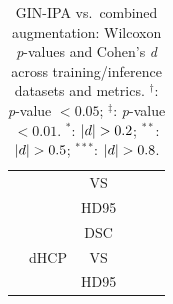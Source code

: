 \begin{table}[htbp]
\begin{tabular}{c|c|c|c|c|c}
      &                             & VS   &  &  &  \\
      &                             & HD95 &  &  &  \\
    \hhline{~-----}
      & \multirow{3}{*}{dHCP} & DSC  &  &  &  \\
      &                       & VS   &  &  &  \\
      &                       & HD95 &  &  &  \\
    \bottomrule
  \end{tabular}
  \caption{GIN-IPA vs.\ combined augmentation: Wilcoxon \textit{p}-values and Cohen's \textit{d} across training/inference datasets and metrics. ${ }^{\dagger}$: \textit{p}-value $< 0.05$; ${ }^{\ddagger}$: \textit{p}-value $<0.01$. ${ }^{*}$: $\lvert d\rvert>0.2$; ${ }^{**}$: $\lvert d\rvert>0.5$; ${ }^{***}$: $\lvert d\rvert>0.8$.}
  \label{tab:comparison_2}
\end{table}
